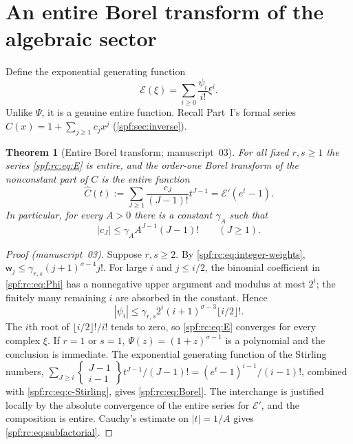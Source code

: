 \documentclass[11pt]{article}
\numberwithin{equation}{section}
\newtheorem{theorem}{Theorem}[section]
\theoremstyle{definition}
\theoremstyle{remark}
\theoremstyle{definition}
\newcommand{\rcw}{\mathsf w}
\newcommand{\Stir}[2]{\left\{\begin{matrix}#1\\#2\end{matrix}\right\}}
\begin{document}
\section{An entire Borel transform of the algebraic sector}
\label{spf:rc:sec:Borel}

Define the exponential generating function
\begin{equation}
 \mathcal E(\xi)=\sum_{i\ge0}\frac{\psi_i}{i!}\xi^i.
 \label{spf:rc:eq:E}
\end{equation}
Unlike $\Psi$, it is a genuine entire function. Recall Part~I's formal series
$C(x)=1+\sum_{j\ge1}c_jx^j$ (\cref{spf:sec:inverse}).

\begin{theorem}[Entire Borel transform; manuscript~03]
\label{spf:rc:thm:Borel}
For all fixed $r,s\ge1$ the series \eqref{spf:rc:eq:E} is entire, and the
order-one Borel transform of the nonconstant part of $C$ is the entire
function
\begin{equation}
 \boxed{\displaystyle
 \widehat C(t):=\sum_{J\ge1}\frac{c_J}{(J-1)!}t^{J-1}
             =\mathcal E'(e^t-1).}
 \label{spf:rc:eq:Borel}
\end{equation}
In particular, for every $A>0$ there is a constant $\gamma_A$ such that
\begin{equation}
 |c_J|\le\gamma_AA^{J-1}(J-1)!\qquad(J\ge1).
 \label{spf:rc:eq:subfactorial}
\end{equation}
\end{theorem}

\begin{proof}[Proof (manuscript~03)]
Suppose $r,s\ge2$. By \eqref{spf:rc:eq:integer-weights},
$\rcw_j\le\gamma_{r,s}(j+1)^{\sigma-4}j!$. For large $i$ and $j\le i/2$, the
binomial coefficient in \eqref{spf:rc:eq:Phi} has a nonnegative upper
argument and modulus at most $2^i$; the finitely many remaining $i$ are
absorbed in the constant. Hence
\begin{equation}
 |\psi_i|\le\gamma_{r,s}2^i(i+1)^{\sigma-3}\lfloor i/2\rfloor!.
 \label{spf:rc:eq:psi-growth}
\end{equation}
The $i$th root of $\lfloor i/2\rfloor!/i!$ tends to zero, so
\eqref{spf:rc:eq:E} converges for every complex $\xi$. If $r=1$ or $s=1$,
$\Psi(z)=(1+z)^{\sigma-1}$ is a polynomial and the conclusion is immediate.
The exponential generating function of the Stirling numbers,
$\sum_{J\ge i}\Stir{J-1}{i-1}t^{J-1}/(J-1)!=(e^t-1)^{i-1}/(i-1)!$, combined
with \eqref{spf:rc:eq:c-Stirling}, gives \eqref{spf:rc:eq:Borel}. The
interchange is justified locally by the absolute convergence of the entire
series for $\mathcal E'$, and the composition is entire. Cauchy's estimate
on $|t|=1/A$ gives \eqref{spf:rc:eq:subfactorial}.
\end{proof}
\end{document}
